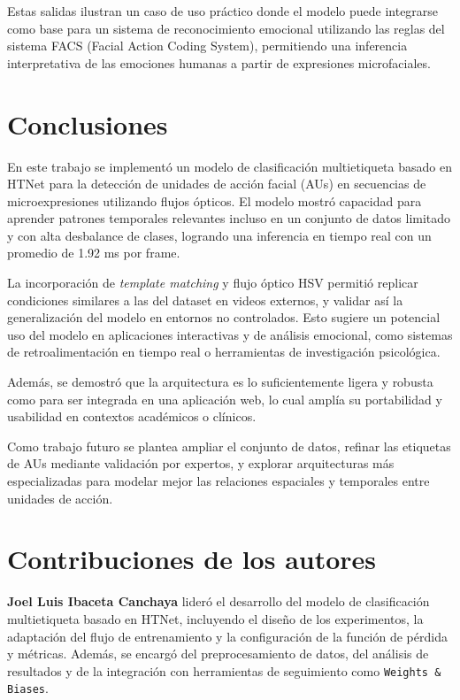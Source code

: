 \documentclass[conference]{IEEEtran}
\begin{document}
Estas salidas ilustran un caso de uso práctico donde el modelo puede integrarse como base para un sistema de reconocimiento emocional utilizando las reglas del sistema FACS (Facial Action Coding System), permitiendo una inferencia interpretativa de las emociones humanas a partir de expresiones microfaciales.


\section{Conclusiones}

En este trabajo se implementó un modelo de clasificación multietiqueta basado en HTNet para la detección de unidades de acción facial (AUs) en secuencias de microexpresiones utilizando flujos ópticos. El modelo mostró capacidad para aprender patrones temporales relevantes incluso en un conjunto de datos limitado y con alta desbalance de clases, logrando una inferencia en tiempo real con un promedio de 1.92 ms por frame.

La incorporación de \textit{template matching} y flujo óptico HSV permitió replicar condiciones similares a las del dataset en videos externos, y validar así la generalización del modelo en entornos no controlados. Esto sugiere un potencial uso del modelo en aplicaciones interactivas y de análisis emocional, como sistemas de retroalimentación en tiempo real o herramientas de investigación psicológica.

Además, se demostró que la arquitectura es lo suficientemente ligera y robusta como para ser integrada en una aplicación web, lo cual amplía su portabilidad y usabilidad en contextos académicos o clínicos.

Como trabajo futuro se plantea ampliar el conjunto de datos, refinar las etiquetas de AUs mediante validación por expertos, y explorar arquitecturas más especializadas para modelar mejor las relaciones espaciales y temporales entre unidades de acción.


\section*{Contribuciones de los autores}

\textbf{Joel Luis Ibaceta Canchaya} lideró el desarrollo del modelo de clasificación multietiqueta basado en HTNet, incluyendo el diseño de los experimentos, la adaptación del flujo de entrenamiento y la configuración de la función de pérdida y métricas. Además, se encargó del preprocesamiento de datos, del análisis de resultados y de la integración con herramientas de seguimiento como \texttt{Weights \& Biases}.
\end{document}
